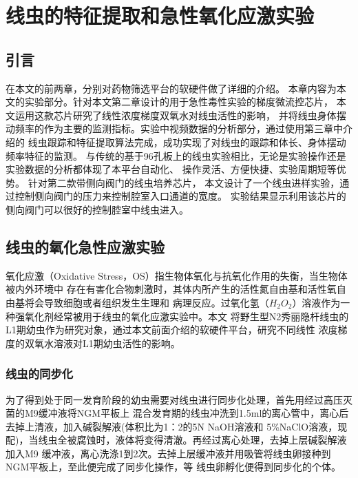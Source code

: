 \chapter{线虫的特征提取和急性氧化应激实验}
\section{引言}
	在本文的前两章，分别对药物筛选平台的软硬件做了详细的介绍。
	本章内容为本文的实验部分。针对本文第二章设计的用于急性毒性实验的梯度微流控芯片，
	本文运用这款芯片研究了线性浓度梯度双氧水对线虫活性的影响，
	并将线虫身体摆动频率的作为主要的监测指标。实验中视频数据的分析部分，通过使用第三章中介绍的
	线虫跟踪和特征提取算法完成，成功实现了对线虫的跟踪和体长、身体摆动频率特征的监测。
	与传统的基于96孔板上的线虫实验相比，无论是实验操作还是实验数据的分析都体现了本平台自动化、
	操作灵活、方便快捷、实验周期短等优势。
	针对第二款带侧向阀门的线虫培养芯片，
	本文设计了一个线虫进样实验，通过控制侧向阀门的压力来控制腔室入口通道的宽度。
	实验结果显示利用该芯片的侧向阀门可以很好的控制腔室中线虫进入。
\section{线虫的氧化急性应激实验}
	氧化应激（Oxidative Stress，OS）指生物体氧化与抗氧化作用的失衡，当生物体被内外环境中
	存在有害化合物刺激时，其体内所产生的活性氮自由基和活性氧自由基将会导致细胞或者组织发生生理和
	病理反应。过氧化氢（$H_2O_2$）溶液作为一种强氧化剂经常被用于线虫的氧化应激实验中。本文
	将野生型N2秀丽隐杆线虫的L1期幼虫作为研究对象，通过本文前面介绍的软硬件平台，研究不同线性
	浓度梯度的双氧水溶液对L1期幼虫活性的影响。
\subsection{线虫的同步化}
	为了得到处于同一发育阶段的幼虫需要对线虫进行同步化处理，首先用经过高压灭菌的M9缓冲液将NGM平板上
	混合发育期的线虫冲洗到1.5ml的离心管中，离心后去掉上清液，加入碱裂解液(体积比为1：2的5N NaOH溶液和
	5\%NaClO溶液，现配)，当线虫全被腐蚀时，液体将变得清澈。再经过离心处理，去掉上层碱裂解液加入M9
	缓冲液，离心洗涤1到2次。去掉上层缓冲液并用吸管将线虫卵接种到NGM平板上，至此便完成了同步化操作，等
	线虫卵孵化便得到同步化的个体。
